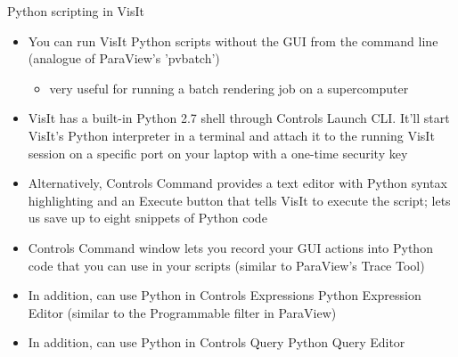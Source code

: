 \begin{comment}
http://www.visitusers.org/index.php?title=VisIt-tutorial-Python-scripting
http://www.visitusers.org/index.php?title=VisIt-tutorial-Advanced-scripting
http://www.visitusers.org/index.php?title=Exporting_databases
abc Tips for searching for help
http://www.visitusers.org/index.php?title=VisIt-tutorial-Python-scripting#Learning_the_CLI
\end{comment}


\begin{frame}{Python scripting in VisIt}{}
  \footnotesize{
    \begin{itemize}\setlength{\itemsep}{1mm}
    \item[\ding{80}] You can run VisIt Python scripts without the GUI from the command line (analogue of
      ParaView's 'pvbatch')\guiless\vspace{-3mm}
      \begin{itemize}\setlength{\itemsep}{0mm}
      \item very useful for running a batch rendering job on a supercomputer
      \end{itemize}
    \item[\ding{80}] VisIt has a built-in Python 2.7 shell through Controls \ra Launch CLI. It'll start
      VisIt's Python interpreter in a terminal and attach it to the running VisIt session on a specific
      port on your laptop with a one-time security key
    \item[\ding{80}] Alternatively, Controls \ra Command provides a text editor with Python syntax
      highlighting and an Execute button that tells VisIt to execute the script; lets us save up to eight
      snippets of Python code
    \item {\color{red}Controls \ra Command window lets you record your GUI actions into Python code that
      you can use in your scripts (similar to ParaView's Trace Tool)}
    \item {\color{blue}In addition, can use Python in Controls \ra Expressions \ra Python Expression
      Editor (similar to the Programmable filter in ParaView)}
    \item {\color{blue}In addition, can use Python in Controls \ra Query \ra Python Query Editor}
    \end{itemize}}
\end{frame}

